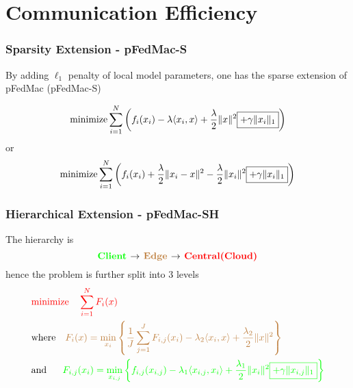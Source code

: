
\section[Communication]{Communication Efficiency}


\begin{frame}
\frametitle{Sparsity Extension - pFedMac-S}

By adding $\ell_1$ penalty of local model parameters, one has the sparse extension of pFedMac (pFedMac-S)

$$\text{minimize} \sum\limits_{i=1}^N \left( f_i(x_i) - \lambda \langle x_i, x \rangle + \dfrac{\lambda}{2} \lVert x \rVert^2 \framebox{$+ \gamma \lVert x_i \rVert_1$} \right)$$
or
$$\text{minimize} \sum\limits_{i=1}^N \left( f_i(x_i) + \dfrac{\lambda}{2} \lVert x_i - x \rVert^2 - \dfrac{\lambda}{2} \lVert x_i \rVert^2 \framebox{$+ \gamma \lVert x_i \rVert_1$} \right)$$


\end{frame}


\begin{frame}
\frametitle{Hierarchical Extension - pFedMac-SH}

The hierarchy is
$$\text{\bf {\color{green}Client} $\to$ {\color{brown}Edge} $\to$ {\color{red}Central(Cloud)}}$$
hence the problem is further split into 3 levels
{\smaller
\begin{align*}
    & {\color{red}\text{minimize} \quad \sum\limits_{i=1}^N F_i(x)} \\
    & \text{where} {\color{brown}\quad F_i(x) = \min_{x_i} \left\{ \dfrac{1}{J} \sum\limits_{j=1}^J F_{i,j}(x_i) - \lambda_2 \langle x_i, x \rangle  + \dfrac{\lambda_2}{2} \lVert x \rVert^2 \right\}} \\
    & \text{and} \quad \ \ {\color{green}F_{i,j}(x_i) = \min_{x_{i,j}} \left\{ f_{i,j}(x_{i,j}) - \lambda_1 \langle x_{i,j}, x_i \rangle  + \dfrac{\lambda_1}{2} \lVert x_i \rVert^2 \framebox{$+ \gamma \lVert x_{i,j} \rVert_1$} \right\}}
\end{align*}
}

\end{frame}




